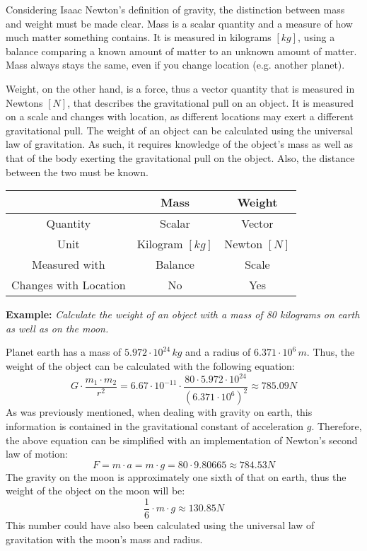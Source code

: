 \pagebreak


Considering Isaac Newton's definition of gravity, the distinction between mass and weight must be made clear. Mass is a scalar quantity and a measure of how much matter something contains. It is measured in kilograms $[kg]$, using a balance comparing a known amount of matter to an unknown amount of matter. Mass always stays the same, even if you change location (e.g. another planet). 

Weight, on the other hand, is a force, thus a vector quantity that is measured in Newtons $[N]$, that describes the gravitational pull on an object. It is measured on a scale and changes with location, as different locations may exert a different gravitational pull. The weight of an object can be calculated using the universal law of gravitation. As such, it requires knowledge of the object's mass as well as that of the body exerting the gravitational pull on the object. Also, the distance between the two must be known. 

\begin{table}[h!]
	\centering
	\begin{tabular}{| c | c | c |}
		\hline
		& Mass & Weight
		\\ \hline
		Quantity & Scalar & Vector
		\\ \hline
		Unit & Kilogram $[kg]$ & Newton $[N]$
		\\ \hline
		Measured with & Balance & Scale
		\\ \hline
		Changes with Location & No & Yes
		\\ \hline
	\end{tabular}
\end{table}

\textbf{Example: } \emph{Calculate the weight of an object with a mass of 80 kilograms on earth as well as on the moon.}

Planet earth has a mass of $5.972 \cdot 10^{24} \,kg$ and a radius of $6.371 \cdot 10^6 \,m$. Thus, the weight of the object can be calculated with the following equation: $$G \cdot \frac{m_1 \cdot m_2}{r^2} =  6.67 \cdot 10^{-11} \cdot \frac{80 \cdot 5.972 \cdot 10^{24}}{(6.371 \cdot 10^6)^2} \approx 785.09 N$$ As was previously mentioned, when dealing with gravity on earth, this information is contained in the gravitational constant of acceleration $g$. Therefore, the above equation can be simplified with an implementation of Newton's second law of motion: $$F = m \cdot a = m \cdot g = 80 \cdot 9.80665 \approx 784.53 N$$ The gravity on the moon is approximately one sixth of that on earth, thus the weight of the object on the moon will be: $$\frac{1}{6} \cdot m \cdot g \approx 130.85 N$$ This number could have also been calculated using the universal law of gravitation with the moon's mass and radius. 

